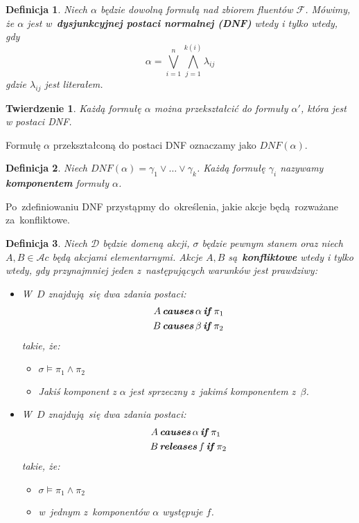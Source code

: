\documentclass[11pt,a4paper]{article}
\newtheorem{defn}{Definicja}
\newtheorem{theorem}{Twierdzenie}
\DeclareMathOperator{\Causes}{\textbf{\textit{causes}}}
\DeclareMathOperator{\If}{\textbf{\textit{if}}}
\DeclareMathOperator{\Releases}{\textbf{\textit{releases}}}
\begin{document}
\begin{defn}
    Niech $\alpha$ będzie dowolną formułą nad zbiorem fluentów $\mathcal{F}$.
    Mówimy, że $\alpha$ jest w~\textbf{dysjunkcyjnej postaci normalnej (DNF)} wtedy i tylko wtedy, gdy 
    $$\alpha = \bigvee_{i=1}^{n} \bigwedge_{j=1}^{k(i)} \lambda_{ij}$$
    gdzie $\lambda_{ij}$ jest literałem.
\end{defn}
    
\begin{theorem}
    Każdą formułę $\alpha$ można przekształcić do formuły $\alpha'$, która jest w postaci DNF.
\end{theorem}

Formułę $\alpha$ przekształconą do postaci DNF oznaczamy jako $DNF(\alpha)$.

\begin{defn}
    Niech $DNF(\alpha) = \gamma_1 \vee \dots \vee \gamma_k$.
    Każdą formułę $\gamma_i$ nazywamy \textbf{komponentem} formuły $\alpha$.
\end{defn}

Po~zdefiniowaniu DNF przystąpmy do~określenia, jakie akcje będą~rozważane za~konfliktowe.

\begin{defn}
    \label{defn:conflict}
    Niech $\mathcal{D}$ będzie domeną akcji, $\sigma$ będzie pewnym stanem oraz niech $A, B \in \mathcal{A}c$ będą akcjami elementarnymi. Akcje $A, B$ są~\textbf{konfliktowe} wtedy i tylko wtedy, gdy przynajmniej jeden z~następujących warunków jest prawdziwy:
    \begin{itemize}
        \item W~$D$ znajdują~się dwa zdania postaci:
        \begin{align*}
            A & \Causes \alpha \If \pi_1 \\
            B & \Causes \beta \If \pi_2
        \end{align*}
        takie, że:
        \begin{itemize}
            \item $\sigma \models \pi_1 \land \pi_2$
            \item Jakiś komponent z $\alpha$ jest sprzeczny z~jakimś komponentem z~$\beta$.
        \end{itemize}
        \item W~$D$ znajdują~się dwa zdania postaci:
        \begin{align*}
            A & \Causes \alpha \If \pi_1 \\
            B & \Releases f \If \pi_2
        \end{align*}
        takie, że:
        \begin{itemize}
            \item $\sigma \models \pi_1 \land \pi_2$
            \item w~jednym z~komponentów $\alpha$ występuje $f$.
        \end{itemize}
    \end{itemize}
\end{defn}
\end{document}
